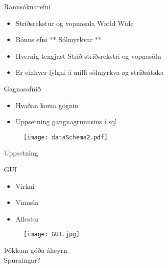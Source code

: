 \documentclass{rubeamer}
\begin{document}
\rutitleframe{}


\begin{frame}{Rannsóknarefni}
	\begin{itemize}
		\item Stríðsrekstur og vopnasala World Wide
		\item Bónus efni ** Sólmyrkvar **
		\item Hvernig tengjast Stríð stríðsrekstri og vopnasölu
		\item Er einhver fylgni á milli sólmyrkva og stríðsátaka
		
	\end{itemize}
\end{frame}

\begin{frame}{Gagnasafnið}
	\vspace{1em}
	\begin{itemize}
		\item Hvaðan koma gögnin
		\item Uppsetning gangnagrunnsins í sql
	\end{itemize}
	
	\begin{figure}
		\centering
		\texttt{[image: dataSchema2.pdf]}
	\end{figure}
\end{frame}

\begin{frame}{Uppsetning }
	\vspace{1em}

	
	\begin{figure}
		\centering
	\end{figure}
\end{frame}

\begin{frame}{GUI}
	\begin{itemize}
		\item Virkni
		\item Vinnsla
		\item Aflestur
	\end{itemize}
	\begin{figure}
		\centering
		\texttt{[image: GUI.jpg]}
	\end{figure}
\end{frame}

	
\begin{frame}
	\centering
	Þökkum góða áheyrn. \\
	Spurningar?\\
\end{frame}

\bibframe
\end{document}
